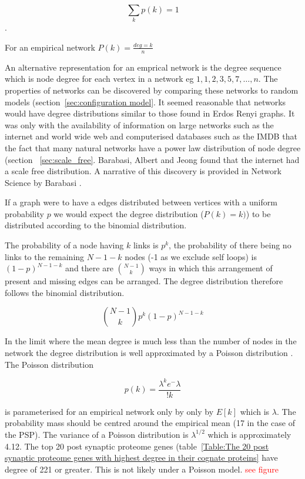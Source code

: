 \begin{equation}
    \sum_k p(k)=1
\end{equation}.

For an empirical network $P(k) = \frac{deg=k}{n}$

An alternative representation for an emprical network is the degree sequence which is  node degree for each vertex in a network eg $1,1,2,3,5,7,\dots,n$. The properties of networks can be discovered by comparing these networks to random models (section~\ref{sec:configuration model}. It seemed reasonable that networks would have degree distributions similar to those found in Erdos Renyi graphs. It was only with the availability of information on large networks such as the internet and world wide web and computerised databases such as the IMDB that the fact that many natural networks have a power law distribution of node degree (section ~\ref{sec:scale_free}. Barabasi, Albert and Jeong found that the internet had a scale free distribution. A narrative of this discovery is provided in Network Science by Barabasi \cite{barabasi2016network}. 


If a graph were to have a  edges distributed between vertices with a uniform probability $p$ we would expect the degree distribution ($P(k)=k)$) to be distributed according to the binomial distribution.  

 The probability of a node having $k$ links is $p^k$, the probability of there being no links to the remaining $N-1-k$ nodes (-1 as we exclude self loops) is $(1-p)^{N-1-k}$ and there are $\binom{N-1}{k}$ ways in which this arrangement of present and missing edges can be arranged. The degree distribution therefore follows the binomial distribution.\cite{barabasi2016network}

\begin{equation}
   \binom{N-1}{k}        p^k (1-p)^{N-1-k}
   \label{Equation:BinomialDistributionForDegreeProbability}
\end{equation}

In the limit where the mean degree is much less than the number of nodes in the network the degree distribution is well approximated by a Poisson distribution \cite{barabasi2016network}. The Poisson distribution

\begin{equation}
    p(k) = \frac{\lambda^k e ^-\lambda}{!k}
\end{equation}

is parameterised for an empirical network only by only by $E[k]$ which is $\lambda$.  The probability mass should be centred around the empirical mean  (17 in the case of the PSP). The variance of a Poisson distribution is $\lambda^{1/2}$ which is approximately 4.12. The top 20 post synaptic proteome genes (table~\ref{Table:The 20 post synaptic proteome genes with highest degree in their cognate proteins} have degree of 221 or greater.  This is not likely under a Poisson model.   
 \textcolor{red}{see figure}


